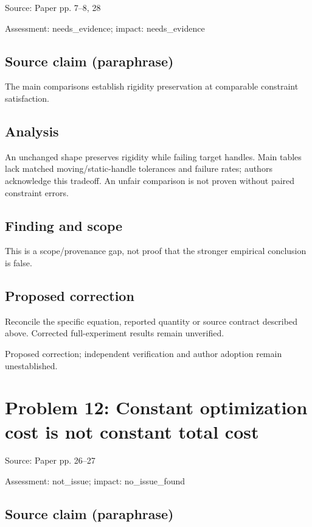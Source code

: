 \documentclass[11pt]{article}
\begin{document}
Source: Paper pp. 7–8, 28

Assessment: needs\_evidence; impact: needs\_evidence

\subsection*{Source claim (paraphrase)}

The main comparisons establish rigidity preservation at comparable constraint satisfaction.

\subsection*{Analysis}

An unchanged shape preserves rigidity while failing target handles. Main tables lack matched moving/static-handle tolerances and failure rates; authors acknowledge this tradeoff. An unfair comparison is not proven without paired constraint errors.

\subsection*{Finding and scope}

This is a scope/provenance gap, not proof that the stronger empirical conclusion is false.

\subsection*{Proposed correction}

Reconcile the specific equation, reported quantity or source contract described above. Corrected full-experiment results remain unverified.

Proposed correction; independent verification and author adoption remain unestablished.

\section*{Problem 12: Constant optimization cost is not constant total cost}

Source: Paper pp. 26–27

Assessment: not\_issue; impact: no\_issue\_found

\subsection*{Source claim (paraphrase)}
\end{document}

